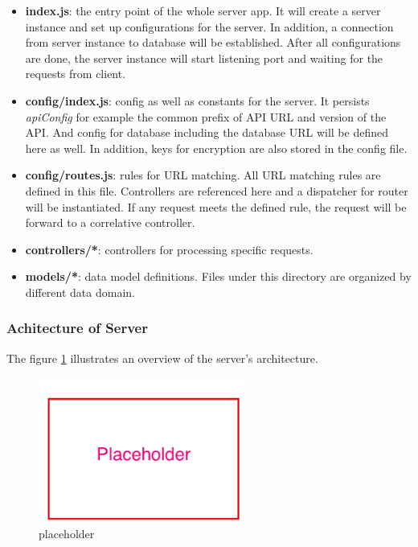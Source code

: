 \begin{itemize}
\item 
  \textbf{index.js}: the entry point of the whole server app. It will create a server instance and set up configurations for the server. In addition, a connection from server instance to database will be established. After all configurations are done, the server instance will start listening port and waiting for the requests from client.
\item
  \textbf{config/index.js}: config as well as constants for the server. It persists \textit{apiConfig} for example the common prefix of API URL and version of the API. And config for database including the database URL will be defined here as well. In addition, keys for encryption are also stored in the config file.
\item
  \textbf{config/routes.js}: rules for URL matching. All URL matching rules are defined in this file. Controllers are referenced here and a dispatcher for router will be instantiated. If any request meets the defined rule, the request will be forward to a correlative controller. 
\item
  \textbf{controllers/*}: controllers for processing specific requests.
\item 
  \textbf{models/*}: data model definitions. Files under this directory are organized by different data domain.
\end{itemize}


\subsubsection{Achitecture of Server}

The figure \ref{fig:server-arch-imp} illustrates an overview of the server's architecture. 

\begin{figure}[!htbp]
  \centering
    \includegraphics[width=0.6\textwidth]{Figures/placeholder.png}
  \caption{placeholder}
  \label{fig:server-arch-imp}
\end{figure}





